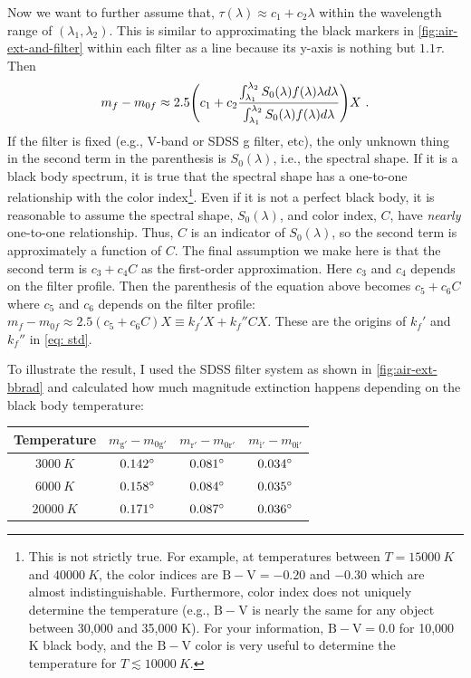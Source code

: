 Now we want to further assume that, $ \tau(\lambda) \approx c_1 + c_2 \lambda $ within the wavelength range of $ (\lambda_1, \lambda_2) $. This is similar to approximating the black markers in \cref{fig:air-ext-and-filter} within each filter as a line because its y-axis is nothing but $ 1.1 \tau $. Then
\begin{equation}
  m_f - m_{0f} 
    \approx 2.5 
    \qty (c_1 + c_2\frac{\int_{\lambda_1}^{\lambda_2} S_0(\lambda) f(\lambda) \lambda d\lambda}
      {\int_{\lambda_1}^{\lambda_2} S_0(\lambda) f(\lambda) d\lambda} ) X ~.
\end{equation}
If the filter is fixed (e.g., V-band or SDSS g filter, etc), the only unknown thing in the second term in the parenthesis is $ S_0(\lambda) $, i.e., the spectral shape. If it is a black body spectrum, it is true that the spectral shape has a one-to-one relationship with the color index\footnote{This is not strictly true. For example, at temperatures between $ T = \SI{15000}{K} $ and $ \SI{40000}{K} $, the color indices are $ \mathrm{B - V} = -0.20 $ and $ -0.30 $ which are almost indistinguishable. Furthermore, color index does not uniquely determine the temperature (e.g., $ \mathrm{B-V} $ is nearly the same for any object between 30,000 and 35,000 K). For your information, $ \mathrm{B-V} = 0.0 $ for 10,000 K black body, and the $ \mathrm{B-V} $ color is very useful to determine the temperature for $ T \lesssim \SI{10000}{K} $.}.
Even if it is not a perfect black body, it is reasonable to assume the spectral shape, $ S_0(\lambda) $, and color index, $ C $, have \textit{nearly} one-to-one relationship. Thus, $ C $ is an indicator of $ S_0(\lambda) $, so the second term is approximately a function of $ C $. The final assumption we make here is that the second term is $ c_3 + c_4 C $ as the first-order approximation. Here $ c_3 $ and $ c_4 $ depends on the filter profile. Then the parenthesis of the equation above becomes $ c_5 + c_6 C $ where $ c_5 $ and $ c_6 $ depends on the filter profile: $ m_f - m_{0f} \approx 2.5 (c_5 + c_6 C) X \equiv k_f' X + k_f'' CX $. These are the origins of $ k_f' $ and $ k_f'' $ in \cref{eq: std}.

To illustrate the result, I used the SDSS filter system as shown in \cref{fig:air-ext-bbrad} and calculated how much magnitude extinction happens depending on the black body temperature:

\begin{table}[ht!]
\centering
  \begin{tabular}{c||ccc}
  Temperature  & $ m_\mathrm{g'} - m_\mathrm{0 g'} $ & $ m_\mathrm{r'} - m_\mathrm{0 r'} $ & $ m_\mathrm{i'} - m_\mathrm{0 i'} $ \\
  \hline
  $ \SI{3000}{K} $  & $ \m{0.142} $ & $ \m{0.081} $ & $ \m{0.034} $ \\
  $ \SI{6000}{K} $  & $ \m{0.158} $ & $ \m{0.084} $ & $ \m{0.035} $ \\
  $ \SI{20000}{K} $ & $ \m{0.171} $ & $ \m{0.087} $ & $ \m{0.036} $ \\
  \end{tabular}
\end{table}

